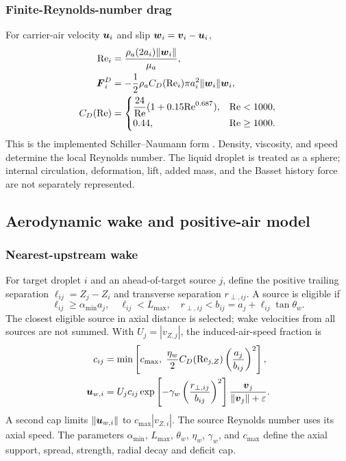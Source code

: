 \subsubsection{Finite-Reynolds-number drag}
For carrier-air velocity $\boldsymbol{u}_i$ and slip $\boldsymbol{w}_i=\boldsymbol{v}_i-\boldsymbol{u}_i$,
\begin{align}
 \mathrm{Re}_i&=\frac{\rho_a(2a_i)\|\boldsymbol{w}_i\|}{\mu_a},\\
 \boldsymbol{F}^D_i&=-\frac{1}{2}\rho_a C_D(\mathrm{Re}_i)\pi a_i^2
                     \|\boldsymbol{w}_i\|\boldsymbol{w}_i,\\
 C_D(\mathrm{Re})&=
 \begin{cases}
 \dfrac{24}{\mathrm{Re}}(1+0.15\mathrm{Re}^{0.687}),&\mathrm{Re}<1000,\\
 0.44,&\mathrm{Re}\geq1000.
 \end{cases}
\label{eq:drag}
\end{align}
This is the implemented Schiller--Naumann form \citep{openfoamdrag}. Density, viscosity, and speed determine the local Reynolds number. The liquid droplet is treated as a sphere; internal circulation, deformation, lift, added mass, and the Basset history force are not separately represented.

\subsection{Aerodynamic wake and positive-air model}
\subsubsection{Nearest-upstream wake}
For target droplet $i$ and an ahead-of-target source $j$, define the positive trailing separation $\ell_{ij}=Z_j-Z_i$ and transverse separation $r_{\perp,ij}$. A source is eligible if
\begin{equation}
 \ell_{ij}\geq\alpha_{\min}a_j,\quad
 \ell_{ij}<L_{\max},\quad
 r_{\perp,ij}<b_{ij}=a_j+\ell_{ij}\tan\theta_w.
\end{equation}
The closest eligible source in axial distance is selected; wake velocities from all sources are not summed. With $U_j=|v_{Z,j}|$, the induced-air-speed fraction is
\begin{align}
 c_{ij}&=\min\left[c_{\max},\;\frac{\eta_w}{2}C_D(\mathrm{Re}_{j,Z})
                              \left(\frac{a_j}{b_{ij}}\right)^2\right],\\
 \boldsymbol{u}_{w,i}&=U_j c_{ij}
 \exp\left[-\gamma_w\left(\frac{r_{\perp,ij}}{b_{ij}}\right)^2\right]
 \frac{\boldsymbol{v}_j}{\|\boldsymbol{v}_j\|+\varepsilon}.
\end{align}
A second cap limits $\|\boldsymbol{u}_{w,i}\|$ to $c_{\max}|v_{Z,i}|$. The source Reynolds number uses its axial speed. The parameters $\alpha_{\min}$, $L_{\max}$, $\theta_w$, $\eta_w$, $\gamma_w$, and $c_{\max}$ define the axial support, spread, strength, radial decay and deficit cap.

